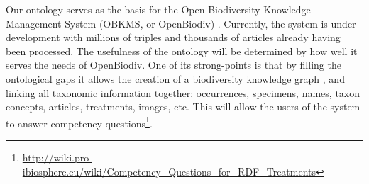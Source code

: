 \documentclass{IOS-Book-Article}
\begin{document}
Our ontology serves as the basis for the Open Biodiversity Knowledge Management System (OBKMS, or OpenBiodiv) \cite{r5}. Currently, the system is under development with millions of triples and thousands of articles already having been processed. The usefulness of the ontology will be determined by how well it serves the needs of OpenBiodiv. One of its strong-points is that by filling the ontological gaps it allows the creation of a biodiversity knowledge graph \cite{r23}, and linking all taxonomic information together: occurrences, specimens, names, taxon concepts, articles, treatments, images, etc. This will allow the users of the system to answer competency questions\footnote{\url{http://wiki.pro-ibiosphere.eu/wiki/Competency\_Questions\_for\_RDF\_Treatments}}.

%
\end{document}
